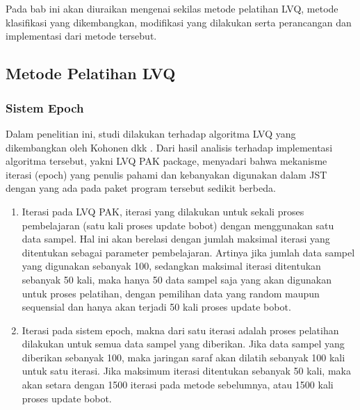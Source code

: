 \chapter{\babEmpat}
Pada bab ini akan diuraikan mengenai sekilas metode pelatihan LVQ, metode
klasifikasi yang dikembangkan, modifikasi yang dilakukan serta perancangan dan
implementasi dari metode tersebut.

\section{Metode Pelatihan LVQ}
\subsection{Sistem Epoch}
Dalam penelitian ini, studi dilakukan terhadap algoritma LVQ yang dikembangkan
oleh Kohonen dkk \cite{Kohonen92lvqpak}. Dari hasil analisis terhadap
implementasi algoritma tersebut, yakni LVQ PAK package, \saya menyadari bahwa
mekanisme iterasi (epoch) yang penulis pahami dan kebanyakan digunakan
dalam JST dengan yang ada pada paket program tersebut sedikit berbeda.
\begin{enumerate}
  \item Iterasi pada LVQ PAK, iterasi yang dilakukan untuk sekali proses
  pembelajaran (satu kali proses update bobot) dengan menggunakan satu data
  sampel. Hal ini akan berelasi dengan jumlah maksimal iterasi yang ditentukan
  sebagai parameter pembelajaran. Artinya jika jumlah data sampel yang digunakan
  sebanyak 100, sedangkan maksimal iterasi ditentukan sebanyak 50 kali, maka
  hanya 50 data sampel saja yang akan digunakan untuk proses pelatihan, dengan
  pemilihan data yang random maupun sequensial dan hanya akan terjadi 50 kali
  proses update bobot.
  \item Iterasi pada sistem epoch, makna dari satu iterasi adalah
  proses pelatihan dilakukan untuk semua data sampel yang diberikan. Jika data
  sampel yang diberikan sebanyak 100, maka jaringan saraf akan dilatih sebanyak
  100 kali untuk satu iterasi. Jika maksimum iterasi ditentukan sebanyak 50
  kali, maka akan setara dengan 1500 iterasi pada metode sebelumnya, atau 1500
  kali proses update bobot.
\end{enumerate}

